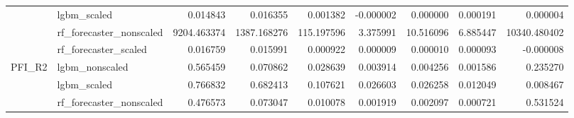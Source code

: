 \begin{tabular}{llrrrrrrr}
 & lgbm\_scaled & {\cellcolor[HTML]{D44E41}} \color[HTML]{F1F1F1} 0.014843 & {\cellcolor[HTML]{B40426}} \color[HTML]{F1F1F1} 0.016355 & {\cellcolor[HTML]{5470DE}} \color[HTML]{F1F1F1} 0.001382 & {\cellcolor[HTML]{3B4CC0}} \color[HTML]{F1F1F1} -0.000002 & {\cellcolor[HTML]{3B4CC0}} \color[HTML]{F1F1F1} 0.000000 & {\cellcolor[HTML]{3E51C5}} \color[HTML]{F1F1F1} 0.000191 & {\cellcolor[HTML]{3B4CC0}} \color[HTML]{F1F1F1} 0.000004 \\
 & rf\_forecaster\_nonscaled & {\cellcolor[HTML]{D95847}} \color[HTML]{F1F1F1} 9204.463374 & {\cellcolor[HTML]{6485EC}} \color[HTML]{F1F1F1} 1387.168276 & {\cellcolor[HTML]{3D50C3}} \color[HTML]{F1F1F1} 115.197596 & {\cellcolor[HTML]{3B4CC0}} \color[HTML]{F1F1F1} 3.375991 & {\cellcolor[HTML]{3B4CC0}} \color[HTML]{F1F1F1} 10.516096 & {\cellcolor[HTML]{3B4CC0}} \color[HTML]{F1F1F1} 6.885447 & {\cellcolor[HTML]{B40426}} \color[HTML]{F1F1F1} 10340.480402 \\
 & rf\_forecaster\_scaled & {\cellcolor[HTML]{B40426}} \color[HTML]{F1F1F1} 0.016759 & {\cellcolor[HTML]{C43032}} \color[HTML]{F1F1F1} 0.015991 & {\cellcolor[HTML]{4B64D5}} \color[HTML]{F1F1F1} 0.000922 & {\cellcolor[HTML]{3B4CC0}} \color[HTML]{F1F1F1} 0.000009 & {\cellcolor[HTML]{3B4CC0}} \color[HTML]{F1F1F1} 0.000010 & {\cellcolor[HTML]{3C4EC2}} \color[HTML]{F1F1F1} 0.000093 & {\cellcolor[HTML]{3B4CC0}} \color[HTML]{F1F1F1} -0.000008 \\
\multirow[c]{4}{*}{PFI\_R2} & lgbm\_nonscaled & {\cellcolor[HTML]{B40426}} \color[HTML]{F1F1F1} 0.565459 & {\cellcolor[HTML]{6180E9}} \color[HTML]{F1F1F1} 0.070862 & {\cellcolor[HTML]{4961D2}} \color[HTML]{F1F1F1} 0.028639 & {\cellcolor[HTML]{3C4EC2}} \color[HTML]{F1F1F1} 0.003914 & {\cellcolor[HTML]{3C4EC2}} \color[HTML]{F1F1F1} 0.004256 & {\cellcolor[HTML]{3B4CC0}} \color[HTML]{F1F1F1} 0.001586 & {\cellcolor[HTML]{C5D6F2}} \color[HTML]{000000} 0.235270 \\
 & lgbm\_scaled & {\cellcolor[HTML]{B40426}} \color[HTML]{F1F1F1} 0.766832 & {\cellcolor[HTML]{D95847}} \color[HTML]{F1F1F1} 0.682413 & {\cellcolor[HTML]{6384EB}} \color[HTML]{F1F1F1} 0.107621 & {\cellcolor[HTML]{4257C9}} \color[HTML]{F1F1F1} 0.026603 & {\cellcolor[HTML]{4257C9}} \color[HTML]{F1F1F1} 0.026258 & {\cellcolor[HTML]{3C4EC2}} \color[HTML]{F1F1F1} 0.012049 & {\cellcolor[HTML]{3B4CC0}} \color[HTML]{F1F1F1} 0.008467 \\
 & rf\_forecaster\_nonscaled & {\cellcolor[HTML]{D75445}} \color[HTML]{F1F1F1} 0.476573 & {\cellcolor[HTML]{6485EC}} \color[HTML]{F1F1F1} 0.073047 & {\cellcolor[HTML]{3F53C6}} \color[HTML]{F1F1F1} 0.010078 & {\cellcolor[HTML]{3B4CC0}} \color[HTML]{F1F1F1} 0.001919 & {\cellcolor[HTML]{3B4CC0}} \color[HTML]{F1F1F1} 0.002097 & {\cellcolor[HTML]{3B4CC0}} \color[HTML]{F1F1F1} 0.000721 & {\cellcolor[HTML]{B40426}} \color[HTML]{F1F1F1} 0.531524 \\

\end{tabular}
